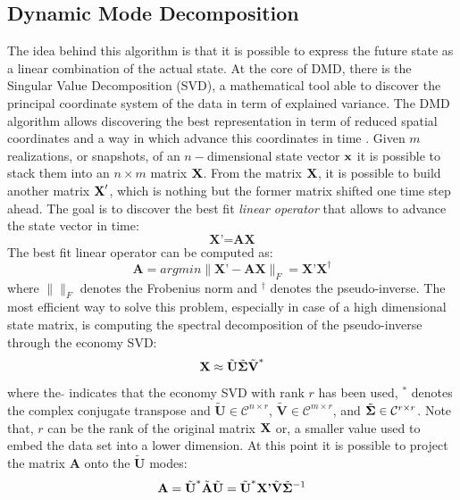 \documentclass[]{article}
\begin{document}
\subsection{Dynamic Mode Decomposition}
The idea behind this algorithm is that it is possible to express the future state as a linear combination of the actual state. At the core of DMD, there is the Singular Value Decomposition (SVD), a mathematical tool able to discover the principal coordinate system of the data in term of explained variance. The DMD algorithm allows discovering the best representation in term of reduced spatial coordinates and a way in which advance this coordinates in time \cite{brunton2019}. Given $m$ realizations, or snapshots, of an $n-$dimensional state vector $\textbf x$ it is possible to stack them into an $n \times m$ matrix $\textbf X$. From the matrix $\textbf X$, it is possible to build another matrix $\textbf X'$, which is nothing but the former matrix shifted one time step ahead. The goal is to discover the best fit \textit{linear operator} that allows to advance the state vector in time:
\begin{equation}\label{bestfit}
\textbf{X'} = \textbf{A} \textbf{X}
\end{equation}
The best fit linear operator can be computed as:
\begin{equation}\label{bestfit}
    \textbf{A} = argmin \parallel \textbf{X'} - \textbf{A} \textbf{X} \parallel_F = \textbf{X'} \textbf{X}^\dagger 
\end{equation}
where $\parallel \parallel_F$ denotes the Frobenius norm and $^\dagger$ denotes the pseudo-inverse. The most efficient way to solve this problem, especially in case of a high dimensional state matrix, is computing the spectral decomposition of the pseudo-inverse through the economy SVD:
\begin{equation}\label{svd}
    \textbf{X} \approx \tilde{\textbf{U}} \tilde{\bf\Sigma} \tilde{\textbf{V}}^*
\end{equation}
where the $\tilde{} $ indicates that the economy SVD with rank $r$ has been used, $^*$ denotes the complex conjugate transpose and $\tilde{\textbf{U}} \in \mathcal{C}^{n \times r}$, $\tilde{\textbf{V}} \in \mathcal{C}^{m \times r}$, and $\tilde{\bf{\Sigma}} \in \mathcal{C}^{r \times r}$. Note that, $r$ can be the rank of the original matrix $\textbf X$ or, a smaller value used to embed the data set into a lower dimension. At this point it is possible to project the matrix $\textbf{A}$ onto the $\tilde{\textbf{U}}$ modes:
\begin{equation}\label{atilde}
    \textbf{A} = \tilde{\textbf{U}}^* \tilde{\textbf{A}} \tilde{\textbf{U}} = \tilde{\textbf{U}}^* \textbf{X'} \tilde{\textbf{V}} \tilde{\bf{\Sigma}}^{-1}
\end{equation}
\end{document}
